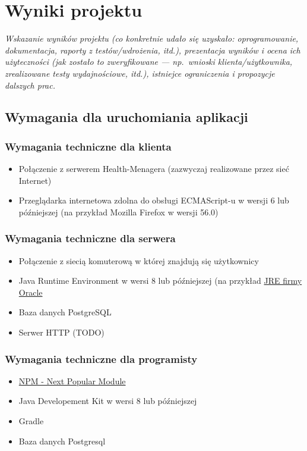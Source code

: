 \documentclass[polish,12pt]{aghthesis}
\begin{document}
\section{Wyniki projektu}

\label{sec:wyniki-projektu}

\emph{Wskazanie wyników projektu (co konkretnie udało się uzyskało:
  oprogramowanie, dokumentacja, raporty z testów/wdrożenia, itd.), prezentacja wyników
  i ocena ich użyteczności (jak zostało to zweryfikowane --- np.\ wnioski
  klienta/użytkownika, zrealizowane testy wydajnościowe, itd.),
  istniejce ograniczenia i propozycje dalszych prac.}

\subsection{Wymagania dla uruchomiania aplikacji}
\subsubsection{Wymagania techniczne dla klienta}
\begin{itemize}
  \item  Połączenie z serwerem Health-Menagera (zazwyczaj realizowane przez sieć Internet)
  \item Przeglądarka internetowa zdolna do obsługi ECMAScript-u w wersji 6 lub późniejszej (na przykład Mozilla Firefox w wersji 56.0)
\end{itemize}

\subsubsection{Wymagania techniczne dla serwera}
\begin{itemize}
    \item Połączenie z siecią komuterową w której znajdują się użytkownicy
    \item Java Runtime Environment w wersi 8 lub późniejszej (na przykład \href{https://www.java.com/pl/download/manual.jsp}{JRE firmy Oracle}
    \item Baza danych PostgreSQL
    \item Serwer HTTP (TODO)
\end{itemize}

\subsubsection{Wymagania techniczne dla programisty}
\begin{itemize}
    \item \href{https://www.npmjs.com/}{NPM - Next Popular Module}
    \item Java Developement Kit w wersi 8 lub późniejszej
    \item Gradle
    \item Baza danych Postgresql
\end{itemize}
\end{document}
